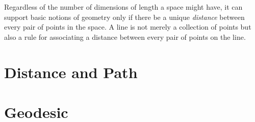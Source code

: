 \documentclass[nobib]{tufte-book}
\begin{document}
Regardless of the number of dimensions of length a space might have, it can
support basic notions of geometry only if there be a unique \emph{distance}
between every pair of points in the space.  A line is not merely a collection
of points but also a rule for associating a distance between every pair of
points on the line.

\section{Distance and Path}

\section{Geodesic}

\appendix

\backmatter






\printindex
\end{document}
